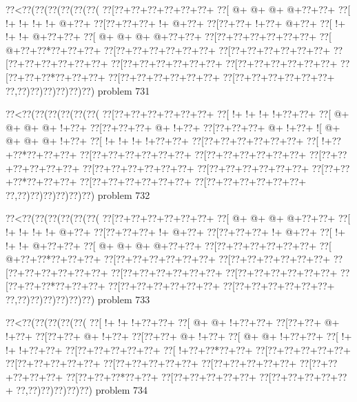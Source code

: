 \vbox{\vbox{\goo
\0??<\0??(\0??(\0??(\0??(\0??(\0??(
\0??[\0??+\0??+\0??+\0??+\0??+\0??+
\0??[\- @+\- @+\- @+\- @+\0??+\0??+
\0??[\- !+\- !+\- !+\- !+\- @+\0??+
\0??[\0??+\0??+\0??+\- !+\- @+\0??+
\0??[\0??+\0??+\- !+\0??+\- @+\0??+
\0??[\- !+\- !+\- !+\- @+\0??+\0??+
\0??[\- @+\- @+\- @+\- @+\0??+\0??+
\0??[\0??+\0??+\0??+\0??+\0??+\0??+
\0??[\- @+\0??+\0??*\0??+\0??+\0??+
\0??[\0??+\0??+\0??+\0??+\0??+\0??+
\0??[\0??+\0??+\0??+\0??+\0??+\0??+
\0??[\0??+\0??+\0??+\0??+\0??+\0??+
\0??[\0??+\0??+\0??+\0??+\0??+\0??+
\0??[\0??+\0??+\0??+\0??+\0??+\0??+
\0??[\0??+\0??+\0??*\0??+\0??+\0??+
\0??[\0??+\0??+\0??+\0??+\0??+\0??+
\0??[\0??+\0??+\0??+\0??+\0??+\0??+
\0??,\0??)\0??)\0??)\0??)\0??)\0??)
}
\hfil problem 731\hfil\break
}

\vbox{\vbox{\goo
\0??<\0??(\0??(\0??(\0??(\0??(\0??(
\0??[\0??+\0??+\0??+\0??+\0??+\0??+
\0??[\- !+\- !+\- !+\- !+\0??+\0??+
\0??[\- @+\- @+\- @+\- @+\- !+\0??+
\0??[\0??+\0??+\0??+\- @+\- !+\0??+
\0??[\0??+\0??+\0??+\- @+\- !+\0??+
\- ![\- @+\- @+\- @+\- @+\- !+\0??+
\0??[\- !+\- !+\- !+\- !+\0??+\0??+
\0??[\0??+\0??+\0??+\0??+\0??+\0??+
\0??[\- !+\0??+\0??*\0??+\0??+\0??+
\0??[\0??+\0??+\0??+\0??+\0??+\0??+
\0??[\0??+\0??+\0??+\0??+\0??+\0??+
\0??[\0??+\0??+\0??+\0??+\0??+\0??+
\0??[\0??+\0??+\0??+\0??+\0??+\0??+
\0??[\0??+\0??+\0??+\0??+\0??+\0??+
\0??[\0??+\0??+\0??*\0??+\0??+\0??+
\0??[\0??+\0??+\0??+\0??+\0??+\0??+
\0??[\0??+\0??+\0??+\0??+\0??+\0??+
\0??,\0??)\0??)\0??)\0??)\0??)\0??)
}
\hfil problem 732\hfil\break
}

\vbox{\vbox{\goo
\0??<\0??(\0??(\0??(\0??(\0??(\0??(
\0??[\0??+\0??+\0??+\0??+\0??+\0??+
\0??[\- @+\- @+\- @+\- @+\0??+\0??+
\0??[\- !+\- !+\- !+\- !+\- @+\0??+
\0??[\0??+\0??+\0??+\- !+\- @+\0??+
\0??[\0??+\0??+\0??+\- !+\- @+\0??+
\0??[\- !+\- !+\- !+\- @+\0??+\0??+
\0??[\- @+\- @+\- @+\- @+\0??+\0??+
\0??[\0??+\0??+\0??+\0??+\0??+\0??+
\0??[\- @+\0??+\0??*\0??+\0??+\0??+
\0??[\0??+\0??+\0??+\0??+\0??+\0??+
\0??[\0??+\0??+\0??+\0??+\0??+\0??+
\0??[\0??+\0??+\0??+\0??+\0??+\0??+
\0??[\0??+\0??+\0??+\0??+\0??+\0??+
\0??[\0??+\0??+\0??+\0??+\0??+\0??+
\0??[\0??+\0??+\0??*\0??+\0??+\0??+
\0??[\0??+\0??+\0??+\0??+\0??+\0??+
\0??[\0??+\0??+\0??+\0??+\0??+\0??+
\0??,\0??)\0??)\0??)\0??)\0??)\0??)
}
\hfil problem 733\hfil\break
}

\vbox{\vbox{\goo
\0??<\0??(\0??(\0??(\0??(\0??(
\0??[\- !+\- !+\- !+\0??+\0??+
\0??[\- @+\- @+\- !+\0??+\0??+
\0??[\0??+\0??+\- @+\- !+\0??+
\0??[\0??+\0??+\- @+\- !+\0??+
\0??[\0??+\0??+\- @+\- !+\0??+
\0??[\- @+\- @+\- !+\0??+\0??+
\0??[\- !+\- !+\- !+\0??+\0??+
\0??[\0??+\0??+\0??+\0??+\0??+
\0??[\- !+\0??+\0??*\0??+\0??+
\0??[\0??+\0??+\0??+\0??+\0??+
\0??[\0??+\0??+\0??+\0??+\0??+
\0??[\0??+\0??+\0??+\0??+\0??+
\0??[\0??+\0??+\0??+\0??+\0??+
\0??[\0??+\0??+\0??+\0??+\0??+
\0??[\0??+\0??+\0??*\0??+\0??+
\0??[\0??+\0??+\0??+\0??+\0??+
\0??[\0??+\0??+\0??+\0??+\0??+
\0??,\0??)\0??)\0??)\0??)\0??)
}
\hfil problem 734\hfil\break
}

